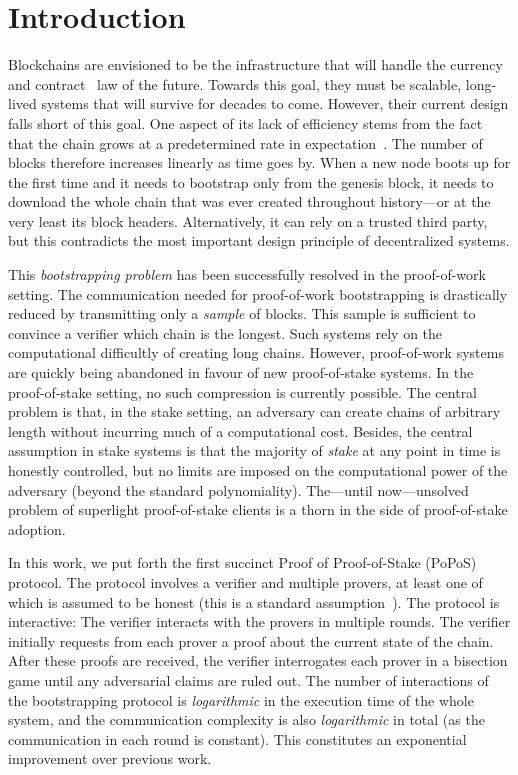 \section{Introduction}

Blockchains are envisioned to be the infrastructure that will handle the currency~\cite{bitcoin} and contract~\cite{buterin,wood}
law of the future. Towards this goal, they must be scalable, long-lived systems that will
survive for decades to come. However, their current design falls short of this goal. One
aspect of its lack of efficiency stems from the fact that the chain grows at a predetermined
rate in expectation~\cite{sok}. The number of blocks therefore increases linearly as time goes by.
When a new node boots up for the first time and it needs to bootstrap only from the genesis
block, it needs to download the whole chain that was ever created throughout history---or
at the very least its block headers. Alternatively, it can rely on a trusted third party,
but this contradicts the most important design principle of decentralized systems.

This \emph{bootstrapping problem} has been successfully resolved in the proof-of-work
setting. The communication needed for proof-of-work bootstrapping is drastically reduced
by transmitting only a
\emph{sample} of blocks. This sample is sufficient to convince
a verifier which chain is the longest. Such systems rely on the
computational difficultly of creating long chains. However, proof-of-work systems are
quickly being abandoned in favour of new proof-of-stake systems. In the proof-of-stake
setting, no such compression is currently possible. The central problem is that, in the
stake setting, an adversary can create chains of arbitrary length without incurring much
of a computational cost. Besides, the central assumption in stake systems is that the
majority of \emph{stake} at any point in time is honestly controlled, but no limits are
imposed on the computational power of the adversary (beyond the standard polynomiality).
The---until now---unsolved problem of superlight proof-of-stake clients is a thorn in the
side of proof-of-stake adoption.

In this work, we put forth the first succinct Proof of Proof-of-Stake (PoPoS) protocol.
The protocol involves a verifier and multiple provers, at least one of which is assumed
to be honest (this is a standard
assumption~\cite{backbone,backbone-new,varbackbone,pass-asynchronous}). The protocol is interactive:
The verifier interacts with the provers in multiple rounds. The verifier initially requests from
each prover a proof about the current state of the chain. After these proofs are received,
the verifier interrogates each prover in a bisection game until any adversarial claims
are ruled out. The number of interactions of the bootstrapping protocol is \emph{logarithmic}
in the execution time of the whole system, and the communication complexity is also \emph{logarithmic}
in total (as the communication in each round is constant). This constitutes an exponential
improvement over previous work.

